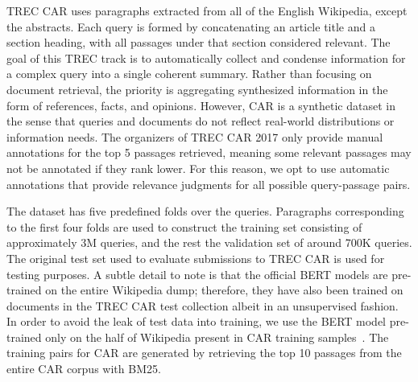 
TREC CAR \cite{dietz2017trec} uses paragraphs extracted from all of the English Wikipedia, except the abstracts.
Each query is formed by concatenating an article title and a section heading, with all passages under that section considered relevant.
The goal of this TREC track is to automatically collect and condense information for a complex query into a single coherent summary.
Rather than focusing on document retrieval, the priority is aggregating synthesized information in the form of references, facts, and opinions.
However, CAR is a synthetic dataset in the sense that queries and documents do not reflect real-world distributions or information needs.
The organizers of TREC CAR 2017 only provide manual annotations for the top 5 passages retrieved, meaning some relevant passages may not be annotated if they rank lower.
For this reason, we opt to use automatic annotations that provide relevance judgments for all possible query-passage pairs.

The dataset has five predefined folds over the queries.
Paragraphs corresponding to the first four folds are used to construct the training set consisting of approximately 3M queries, and the rest the validation set of around 700K queries.
The original test set used to evaluate submissions to TREC CAR is used for testing purposes.
A subtle detail to note is that the official BERT models are pre-trained on the entire Wikipedia dump; therefore, they have also been trained on documents in the TREC CAR test collection albeit in an unsupervised fashion.
In order to avoid the leak of test data into training, we use the BERT model pre-trained only on the half of Wikipedia present in CAR training samples~\cite{nogueira2019passage}.
The training pairs for CAR are generated by retrieving the top 10 passages from the entire CAR corpus with BM25.

